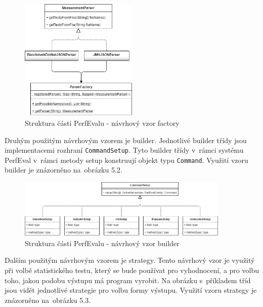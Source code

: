 \begin{figure}[!ht]
    \centering
    \includegraphics[width=0.5\textwidth]{../img/architektura-factory.png}
    \caption{Struktura části PerfEvalu - návrhový vzor factory}
\end{figure}


Druhým použitým návrhovým vzorem je builder. Jednotlivé builder třídy
jsou implementacemi rozhraní \lstinline{CommandSetup}. Tyto builder třídy v~rámci
systému PerfEval v~rámci metody setup konstruují objekt typu \lstinline{Command}.
Využití vzoru builder je znázorněno na~obrázku 5.2.

\begin{figure}[!ht]
    \centering
    \includegraphics[width=0.9\textwidth]{../img/architektura-builder.png}
    \caption{Struktura části PerfEvalu - návrhový vzor builder}
\end{figure}

Dalším použitým návrhovým vzorem je strategy. Tento návrhový vzor je využitý při
volbě statistického testu, který se bude používat pro vyhodnocení, a pro volbu toho,
jakou podobu výstupu má program vyrobit. Na obrázku s~příkladem tříd jsou vidět
jednotlivé strategie pro volbu formy výstupu. Využití vzoru strategy je znázorněno na~obrázku 5.3.

